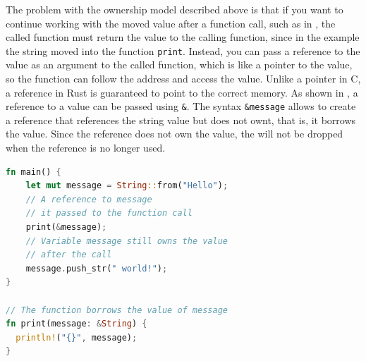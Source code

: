 \documentclass[paper=a4,%
  twoside,%
  BCOR4mm,%
  abstract=true,%
  toc=bibliography,%
  chapterprefix=true,%
  toc=bibliographynumbered,%
  open=right,%
  english,%
  pagesize=pdftex]{scrreprt}
\begin{document}

The problem with the ownership model described above is that if you want to continue working with the moved value after a function call, such as in , the called function must return the value to the calling function, since in the example the string moved into the function \lstinline{print}. Instead, you can pass a reference to the value as an argument to the called function, which is like a pointer to the value, so the function can follow the address and access the value. Unlike a pointer in C, a reference in Rust is guaranteed to point to the correct memory. As shown in , a reference to a value can be passed using \lstinline{&}. The syntax \lstinline{&message} allows to create a reference that references the string value but does not ownt, that is, it borrows the value. Since the reference does not own the value, the will not be dropped when the reference is no longer used.

\begin{lstlisting}[language=Rust, style=boxed, caption={Transferring the ownership to a method}, label=lst:borrowing-method-call]
fn main() {
    let mut message = String::from("Hello");
    // A reference to message
    // it passed to the function call
    print(&message);
    // Variable message still owns the value
    // after the call
    message.push_str(" world!");
}

// The function borrows the value of message
fn print(message: &String) {
  println!("{}", message);
}
\end{lstlisting}
\end{document}

